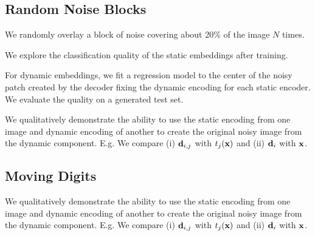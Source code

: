 \documentclass[11pt]{article}
\begin{document}
\subsection{Random Noise Blocks}\label{subsec:disent_mnist_noise_block}

We randomly overlay a block of noise covering about 20\% of the image $N$ times. 

We explore the classification quality of the static embeddings after training.

For dynamic embeddings, we fit a regression model to the center of the noisy patch created by the decoder fixing the dynamic encoding  for each static encoder. We evaluate the quality on a generated test set.

We qualitatively demonstrate the ability to use the static encoding from one image and dynamic encoding of another to create the original noisy image from the dynamic component. E.g. We compare (i) $\boldsymbol{\mathrm{d}}_{i,j}$ with $t_j(\boldsymbol{\mathrm{x}})$ and (ii) $\boldsymbol{\mathrm{d}}_{i}$ with $\boldsymbol{\mathrm{x}}$.

\subsection{Moving Digits}\label{subsec:disent_mnist_motion}

We qualitatively demonstrate the ability to use the static encoding from one image and dynamic encoding of another to create the original noisy image from the dynamic component. E.g. We compare (i) $\boldsymbol{\mathrm{d}}_{i,j}$ with $t_j(\boldsymbol{\mathrm{x}})$ and (ii) $\boldsymbol{\mathrm{d}}_{i}$ with $\boldsymbol{\mathrm{x}}$.


\newpage



\end{document}
